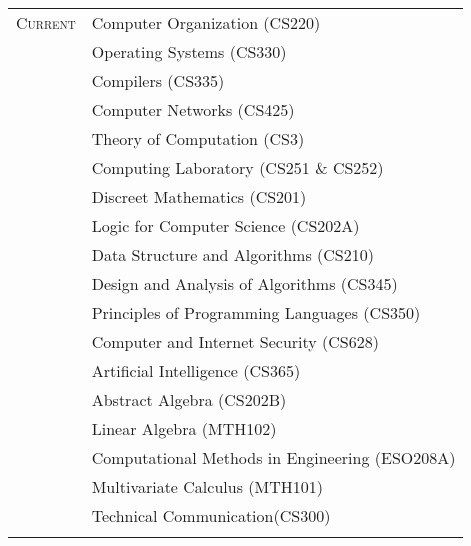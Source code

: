 \documentclass[a4paper,10pt]{article} %
\begin{document}
\begin{tabular}{rl}

    \textsc{Current} & Computer Organization (CS220) \\
                     & Operating Systems (CS330) \\
                     & Compilers (CS335) \\
                     & Computer Networks (CS425) \\
                     & Theory of Computation (CS3) \\
                     & Computing Laboratory (CS251 \& CS252)\\
                     & Discreet Mathematics (CS201)\\
                     & Logic for Computer Science (CS202A)\\
                     & Data Structure and Algorithms (CS210)\\
                     & Design and Analysis of Algorithms (CS345)\\
                     & Principles of Programming Languages (CS350)\\
                     & Computer and Internet Security (CS628)\\
                     & Artificial Intelligence (CS365)\\
                     & Abstract Algebra (CS202B)\\
                     & Linear Algebra (MTH102)\\
                     & Computational Methods in Engineering (ESO208A)\\
                     & Multivariate Calculus (MTH101)\\
                     & Technical Communication(CS300)\\
                     \\
\end{tabular}
\end{document}
